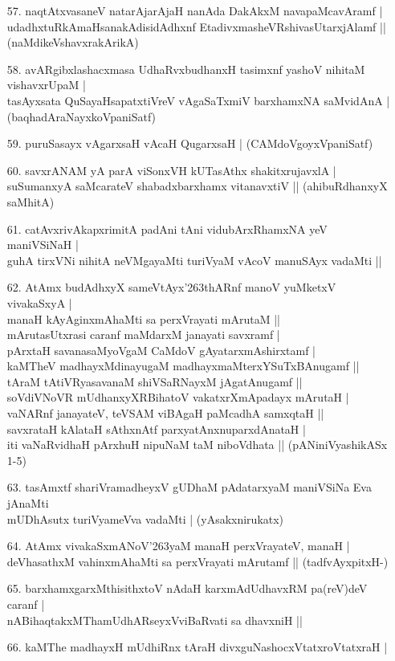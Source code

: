 \begin{itemize}
\item[57.] naqtAtxvasaneV natarAjarAjaH nanAda DakAkxM navapaMcavAramf |\\
udadhxtuRkAmaHsanakAdisidAdhxnf EtadivxmasheVRshivasUtarxjAlamf ||
\hfill{(naMdikeVshavxrakArikA)}
\item[58.] avARgibxlashacxmasa UdhaRvxbudhanxH tasimxnf yashoV nihitaM vishavxrUpaM |\\
tasAyxsata QuSayaHsapatxtiVreV vAgaSaTxmiV barxhamxNA saMvidAnA |
\hfill{(baqhadAraNayxkoVpaniSatf)}
\item[59.] puruSasayx vAgarxsaH vAcaH QugarxsaH |
\hfill{(CAMdoVgoyxVpaniSatf)}
\item[60.] savxrANAM yA parA viSonxVH kUTasAthx shakitxrujavxlA |\\
suSumanxyA saMcarateV shabadxbarxhamx vitanavxtiV ||
\hfill{(ahibuRdhanxyX saMhitA)}
\item[61.] catAvxrivAkapxrimitA padAni tAni vidubArxRhamxNA yeV maniVSiNaH |\\
guhA tirxVNi nihitA neVMgayaMti turiVyaM vAcoV manuSAyx vadaMti ||
\item[62.] AtAmx budAdhxyX sameVtAyx\char'263thARnf manoV yuMketxV vivakaSxyA |\\
manaH kAyAginxmAhaMti sa perxVrayati mArutaM ||\\
mArutasUtxrasi caranf maMdarxM janayati savxramf |\\
pArxtaH savanasaMyoVgaM CaMdoV gAyatarxmAshirxtamf |\\
kaMTheV madhayxMdinayugaM madhayxmaMterxYSuTxBAnugamf ||\\
tAraM tAtiVRyasavanaM shiVSaRNayxM jAgatAnugamf ||\\
soVdiVNoVR mUdhanxyXRBihatoV vakatxrXmApadayx mArutaH |\\
vaNARnf janayateV, teVSAM viBAgaH paMcadhA samxqtaH ||\\
savxrataH kAlataH sAthxnAtf parxyatAnxnuparxdAnataH |\\
iti vaNaRvidhaH pArxhuH nipuNaM taM niboVdhata ||
\hfill{(pANiniVyashikASx 1-5)}
\item[63.] tasAmxtf shariVramadheyxV gUDhaM pAdatarxyaM maniVSiNa Eva jAnaMti \\
mUDhAsutx turiVyameVva vadaMti |
\hfill{(yAsakxnirukatx)}
\item[64.] AtAmx vivakaSxmANoV\char'263yaM manaH perxVrayateV, manaH |\\
deVhasathxM vahinxmAhaMti sa perxVrayati mArutamf ||
\hfill{(tadfvAyxpitxH-)}
\item[65.] barxhamxgarxMthisithxtoV nAdaH karxmAdUdhavxRM pa(reV)deV caranf |\\
nABihaqtakxMThamUdhARseyxVviBaRvati sa dhavxniH ||
\item[66.] kaMThe madhayxH mUdhiRnx tAraH divxguNashocxVtatxroVtatxraH |
\end{itemize}

